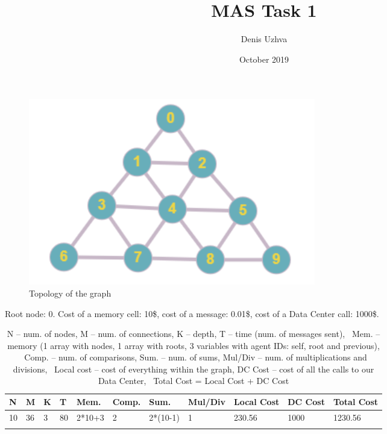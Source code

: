 \documentclass{article}
\begin{document}
\title{MAS Task 1}
\author{Denis Uzhva}
\date{October 2019}
\maketitle

\begin{figure}[H]
    \centering
    \includegraphics[width=.6\textwidth]{triangleTen.png}
    \caption{Topology of the graph}
    \label{fig:gr}
\end{figure}

Root node: 0. Cost of a memory cell: 10\$, cost of a message: 0.01\$, cost of a Data Center call: 1000\$.

\begin{scriptsize}
\begin{longtable}{lllllllllll}
	\toprule
	N	&	M	&	K	&	T	&	Mem.	&	Comp.	&	Sum.		&	Mul/Div	&	Local Cost	&	DC Cost	&	Total Cost	\\
	\midrule
	10	&	36	&	3	&	80	&	2*10+3	&	2		&	2*(10-1)	&	1		&	230.56		&	1000	&	1230.56		\\
    \bottomrule
	\caption{N -- num. of nodes, M -- num. of connections, K -- depth, T -- time (num. of messages sent), \
		Mem. -- memory (1 array with nodes, 1 array with roots, 3 variables with agent IDs: self, root and previous), \
		Comp. -- num. of comparisons, Sum. -- num. of sums, Mul/Div -- num. of multiplications and divisions, \
		Local cost -- cost of everything within the graph, DC Cost -- cost of all the calls to our Data Center, \
		Total Cost = Local Cost + DC Cost}
	\label{tab:acc}
\end{longtable}
\end{scriptsize}
\end{document}
